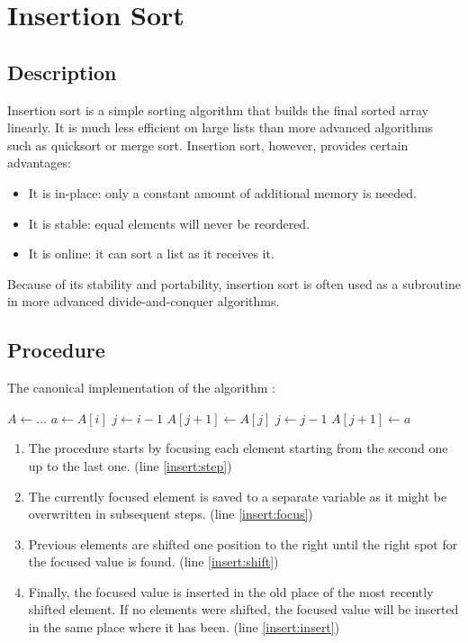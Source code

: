 \section{Insertion Sort}

\subsection{Description}

Insertion sort is a simple sorting algorithm that builds the final sorted array linearly. It is much less efficient on large lists than more advanced algorithms such as quicksort or merge sort. Insertion sort, however, provides certain advantages:

\begin{itemize}
    \item It is in-place: only a constant amount of additional memory is needed.
    \item It is stable: equal elements will never be reordered.
    \item It is online: it can sort a list as it receives it.
\end{itemize}

Because of its stability and portability, insertion sort is often used as a subroutine in more advanced divide-and-conquer algorithms.

\subsection{Procedure}

The canonical implementation of the algorithm \cite{cormen}:

\begin{algorithmic}[1]
    \State $A \gets ...$
     \label{insert:step}
        \State $a \gets A[i]$ \label{insert:focus}
        \State $j \gets i - 1$
         \label{insert:shift}
            \State $A[j + 1] \gets A[j]$
            \State $j \gets j - 1$
        \EndWhile
        \State $A[j + 1] \gets a$ \label{insert:insert}
    \EndFor
\end{algorithmic}

\begin{enumerate}
    \item The procedure starts by focusing each element starting from the second one up to the last one. (line \ref{insert:step})
    \item The currently focused element is saved to a separate variable as it might be overwritten in subsequent steps. (line \ref{insert:focus})
    \item Previous elements are shifted one position to the right until the right spot for the focused value is found. (line \ref{insert:shift})
    \item Finally, the focused value is inserted in the old place of the most recently shifted element. If no elements were shifted, the focused value will be inserted in the same place where it has been. (line \ref{insert:insert})
\end{enumerate}

